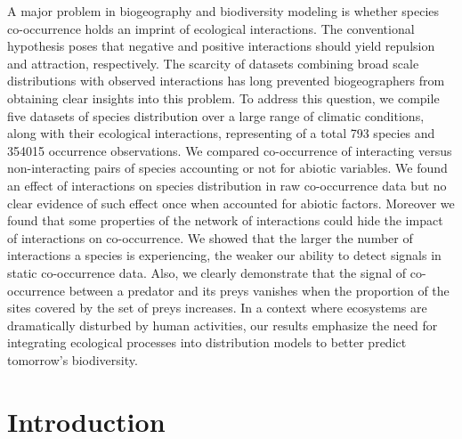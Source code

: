 A major problem in biogeography and biodiversity modeling is whether
species co-occurrence holds an imprint of ecological interactions. The
conventional hypothesis poses that negative and positive interactions
should yield repulsion and attraction, respectively. The scarcity of
datasets combining broad scale distributions with observed interactions
has long prevented biogeographers from obtaining clear insights into
this problem. To address this question, we compile five datasets of
species distribution over a large range of climatic conditions, along
with their ecological interactions, representing of a total 793 species
and 354015 occurrence observations. We compared co-occurrence of
interacting versus non-interacting pairs of species accounting or not
for abiotic variables. We found an effect of interactions on species
distribution in raw co-occurrence data but no clear evidence of such
effect once when accounted for abiotic factors. Moreover we found that
some properties of the network of interactions could hide the impact of
interactions on co-occurrence. We showed that the larger the number of
interactions a species is experiencing, the weaker our ability to detect
signals in static co-occurrence data. Also, we clearly demonstrate that
the signal of co-occurrence between a predator and its preys vanishes
when the proportion of the sites covered by the set of preys increases.
In a context where ecosystems are dramatically disturbed by human
activities, our results emphasize the need for integrating ecological
processes into distribution models to better predict tomorrow's
biodiversity.

\section{Introduction}\label{introduction}

